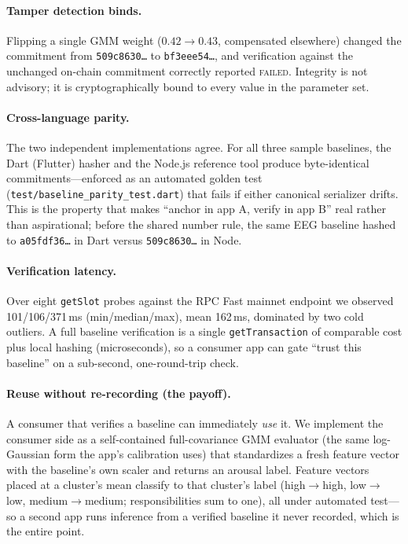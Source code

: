 \documentclass[10pt,twocolumn]{article}
\newcommand{\code}[1]{\texttt{\small #1}}
\begin{document}
\paragraph{Tamper detection binds.} Flipping a single GMM weight
($0.42\!\to\!0.43$, compensated elsewhere) changed the commitment from
\code{509c8630\ldots} to \code{bf3eee54\ldots}, and verification against the
unchanged on-chain commitment correctly reported \textsc{failed}. Integrity is
not advisory; it is cryptographically bound to every value in the parameter set.

\paragraph{Cross-language parity.} The two independent implementations agree.
For all three sample baselines, the Dart (Flutter) hasher and the Node.js
reference tool produce byte-identical commitments---enforced as an automated
golden test (\code{test/baseline\_parity\_test.dart}) that fails if either
canonical serializer drifts. This is the property that makes ``anchor in app A,
verify in app B'' real rather than aspirational; before the shared number rule,
the same EEG baseline hashed to \code{a05fdf36\ldots} in Dart versus
\code{509c8630\ldots} in Node.

\paragraph{Verification latency.} Over eight \code{getSlot} probes against the
RPC Fast mainnet endpoint we observed 101/106/371\,ms
(min/median/max), mean 162\,ms, dominated by two cold outliers. A full baseline
verification is a single \code{getTransaction} of comparable cost plus local
hashing (microseconds), so a consumer app can gate ``trust this baseline'' on a
sub-second, one-round-trip check.

\paragraph{Reuse without re-recording (the payoff).} A consumer that verifies a
baseline can immediately \emph{use} it. We implement the consumer side as a
self-contained full-covariance GMM evaluator (the same log-Gaussian form the
app's calibration uses) that standardizes a fresh feature vector with the
baseline's own scaler and returns an arousal label. Feature vectors placed at a
cluster's mean classify to that cluster's label (high$\to$high, low$\to$low,
medium$\to$medium; responsibilities sum to one), all under automated test---so a
second app runs inference from a verified baseline it never recorded, which is
the entire point.
\end{document}
